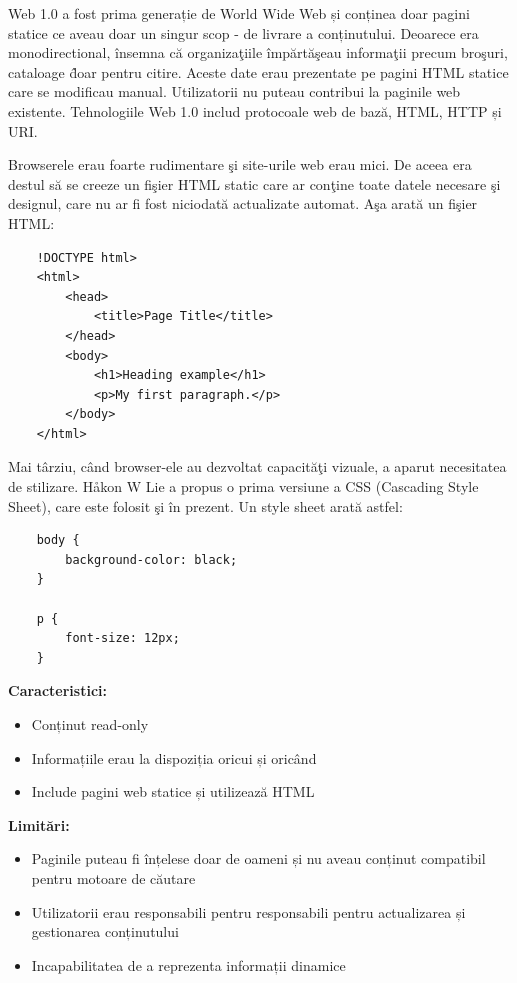 \documentclass[12pt, a4paper]{report}
\begin{document}
Web 1.0 a fost prima generație de World Wide Web și conținea doar pagini statice ce aveau doar un singur scop - de livrare a conținutului. Deoarece era monodirectional, \^ insemna c\u a organiza\c tiile \^ imp\u art\u a\c seau informa\c tii precum bro\c suri, cataloage \^ doar pentru citire. Aceste date erau prezentate pe pagini HTML statice care se modificau manual. Utilizatorii nu puteau contribui la paginile web existente. Tehnologiile Web 1.0 includ protocoale web de bază, HTML, HTTP și URI.

Browserele erau foarte rudimentare \c si site-urile web erau mici. De aceea era destul s\u a se creeze un fi\c sier HTML static care ar con\c tine toate datele necesare \c si designul, care nu ar fi fost niciodat\u a actualizate automat. A\c sa arat\u a un fi\c sier HTML:
\begin{lstlisting}
	!DOCTYPE html>
	<html>
		<head>
			<title>Page Title</title>
		</head>
		<body>
			<h1>Heading example</h1>
			<p>My first paragraph.</p>
		</body>
	</html>
\end{lstlisting}

Mai t\^ arziu, c\^ and browser-ele au dezvoltat capacit\u a\c ti vizuale, a aparut necesitatea de stilizare. Håkon W Lie a propus o prima versiune a CSS (Cascading Style Sheet), care este folosit \c si \^ in prezent. Un style sheet arat\u a astfel:
\begin{lstlisting}
	body {
		background-color: black;
	}

	p {
		font-size: 12px;
	}
\end{lstlisting}

\newpage
\textbf{Caracteristici:}
\begin{itemize}
	\item Conținut read-only
	\item Informațiile erau la dispoziția oricui și oricând
	\item Include pagini web statice și utilizează HTML
\end{itemize}


\textbf{Limitări:}
\begin{itemize}
	\item Paginile puteau fi înțelese doar de oameni și nu aveau conținut compatibil pentru motoare de căutare
	\item Utilizatorii erau responsabili pentru responsabili pentru actualizarea și gestionarea conținutului
	\item Incapabilitatea de a reprezenta informații dinamice
\end{itemize}
\end{document}
